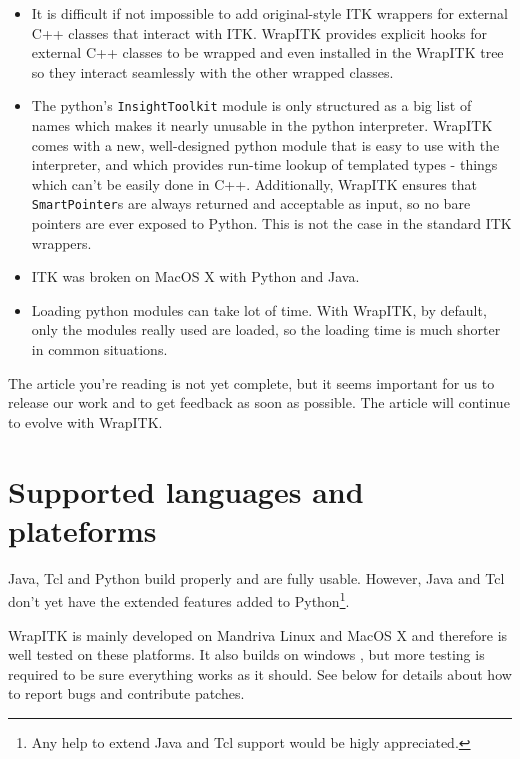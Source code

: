 \documentclass{InsightArticle}
\begin{document}
\begin{itemize}
  \item  It is difficult if not impossible to add original-style ITK wrappers for
external C++ classes that interact with ITK. WrapITK provides explicit hooks for
external C++ classes to be wrapped and even installed in the WrapITK tree so
they interact seamlessly with the other wrapped classes.

  \item  The python's \verb$InsightToolkit$ module is only structured as a big
list of names which makes it nearly unusable in the python interpreter. WrapITK
comes with a new, well-designed python module that is easy to use with the interpreter, and
which provides run-time lookup of templated types - things which can't be easily done
in C++. Additionally, WrapITK ensures that \verb$SmartPointer$s are always
returned and acceptable as input, so no bare pointers are ever exposed to
Python. This is not the case in the standard ITK wrappers.

  \item ITK was broken on MacOS X \cite{MacOsXWebSite} with Python and Java.

  \item  Loading python modules can take lot of time. With WrapITK, by default,
only the modules really used are loaded, so the loading time is much shorter
in common situations.

\end{itemize}

The article you're reading is not yet complete,
but it seems important for us to release our work and to get feedback
as soon as possible. The article will continue to evolve with WrapITK.

\newpage
\part{Supported languages and plateforms}

Java, Tcl and Python build properly and are fully usable. However, Java and
Tcl don't yet have the extended features added to Python\footnote{Any help
to extend Java and Tcl support would be higly appreciated.}.

WrapITK is mainly developed on Mandriva Linux \cite{MandrivaWebSite} and
MacOS X \cite{MacOsXWebSite} and therefore is well tested on these platforms.
It also builds on windows \cite{WindowsWebSite}, but more testing is required
to be sure everything works as it should. See below for details about how
to report bugs and contribute patches.
\end{document}
